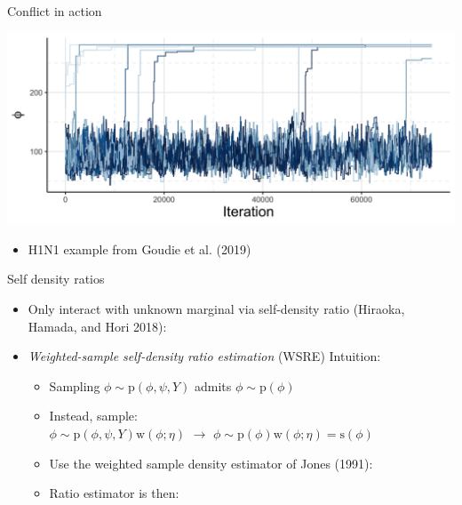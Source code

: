 \documentclass[10pt,ignorenonframetext,]{beamer}
\providecommand{\tightlist}{%
  \setlength{\itemsep}{0pt}\setlength{\parskip}{0pt}}
\newcommand{\pd}{\text{p}}
\newcommand{\w}{\text{w}}
\newcommand{\s}{\text{s}}
\begin{document}
\begin{frame}{Conflict in action}



\begin{center}\includegraphics[width=0.9\linewidth]{figures/stage-two-trace-presentation-one} \end{center}

\begin{itemize}
\tightlist
\item
  H1N1 example from Goudie et al. (2019) 
\end{itemize}

\end{frame}

\begin{frame}{Self density ratios}

\begin{itemize}
\item
  Only interact with unknown marginal via self-density ratio (Hiraoka,
  Hamada, and Hori 2018):
  
\item
  \emph{Weighted-sample self-density ratio estimation} (WSRE) Intuition:

  \begin{itemize}
  \item
    Sampling \(\phi \sim \pd(\phi, \psi, Y)\) admits
    \(\phi \sim \pd(\phi)\)
  \item
    Instead, sample:
    \(\phi \sim \pd(\phi, \psi, Y) \w(\phi; \eta) \,\, \rightarrow \,\, \phi \sim \pd(\phi)\w(\phi; \eta) = \s(\phi)\)
  \item
    Use the weighted sample density estimator of Jones (1991):

    
  \item
    Ratio estimator is then:

    
  \end{itemize}
\end{itemize}

\end{frame}
\end{document}
